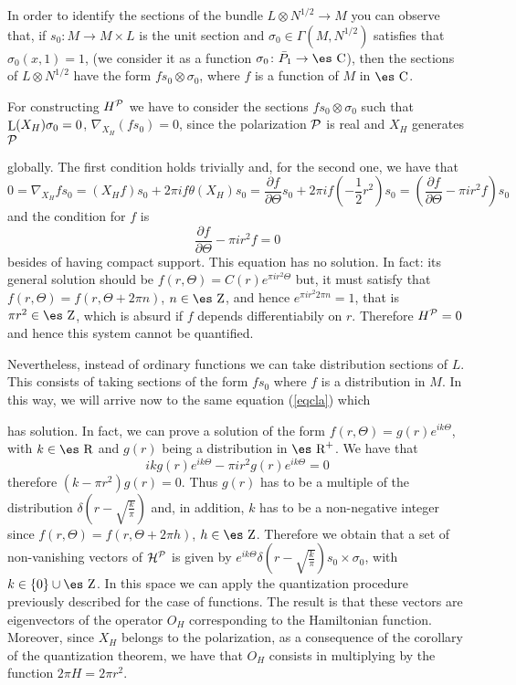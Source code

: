 \documentclass[12pt]{article}
\theoremstyle{plain}
\def\beq{\begin{equation}}
\def\eeq{\end{equation}}
\def\derpar#1#2{\frac{\partial{#1}}{\partial{#2}}}
\def\Zahl{\mbox{\es Z}}
\def\Real{\mbox{\es R}}
\def\Complex{\mbox{\es C}}
\def\Lie{\mathop{\rm L}\nolimits}
\begin{document}
In order to identify the sections of the bundle
$L \otimes N^{1/2} \to M$ you can observe that, if
$s_0 \colon M \to M \times L$ is the unit section and
$\sigma_0 \in \Gamma (M,N^{1/2})$ satisfies that
$\sigma_0(x,1)=1$, (we consider it as a function
$\sigma_0 \colon \bar P_1 \to \Complex$),
then the sections of $L \otimes N^{1/2}$ have the form
$fs_0 \otimes \sigma_0$, where $f$ is a function of $M$ in $\Complex$.

For constructing $H^{\cal P}$ we have to consider the sections
$fs_0 \otimes \sigma_0$ such that
$\Lie(X_H)\sigma_0=0$, $\nabla_{X_H}(fs_0)=0$,
since the polarization ${\cal P}$ is real and $X_H$ generates ${\cal P}$

globally.
The first condition holds trivially and, for the second one, we have
that
$$
0=\nabla_{X_H}fs_0 =(X_Hf)s_0 + 2\pi i f \theta (X_H)s_0=
\derpar{f}{\Theta}s_0 + 2\pi i f(-\frac{1}{2}r^2)s_0 =
(\derpar{f}{\Theta} - \pi i r^2 f)s_0
$$
and the condition for $f$ is
\beq
\derpar{f}{\Theta} - \pi i r^2 f = 0
\label{eqcla}
\eeq
besides of having compact support. This equation has no solution.
In fact: its general solution should be $f(r,\Theta) = C(r)e^{\pi i r^2
\Theta}$
but, it must satisfy that $f(r,\Theta) = f(r,\Theta+2\pi n)$, $n \in
\Zahl$,
and hence $e^{\pi i r^2 2 \pi n} = 1$,
that is $\pi r^2 \in \Zahl$, which is absurd if $f$ depends
differentiabily on $r$.
Therefore $H^{\cal P}=0$ and hence this system cannot be quantified.

Nevertheless, instead of ordinary functions we can take distribution
sections of $L$.
This consists of taking sections of the form $fs_0$ where $f$ is a
distribution in $M$.
In this way, we will arrive now to the same equation (\ref{eqcla}) which

has solution.
In fact, we can prove a solution of the form
$f(r,\Theta)=g(r)e^{ik\Theta}$, with $k \in \Real$ and $g(r)$
being a distribution in $\Real^+$. We have that
$$
ikg(r)e^{ik\Theta}-\pi ir^2g(r)e^{ik\Theta}=0
$$
therefore $(k-\pi r^2)g(r)=0$.
Thus $g(r)$ has to be a multiple of the distribution $\delta
(r-\sqrt{\frac{k}{\pi}})$
and, in addition, $k$ has to be a non-negative integer since
$f(r,\Theta ) = f(r,\Theta +2\pi h)$, $h \in \Zahl$.
Therefore we obtain that a set of non-vanishing vectors of
${\cal H}^{\cal P}$ is given by
$e^{ik\Theta}\delta (r-\sqrt{\frac{k}{\pi}})s_0 \times \sigma_0$,
with $k\in\{ 0\}\cup\Zahl$.
In this space we can apply the quantization procedure previously
described
for the case of functions. The result is that these vectors are
eigenvectors of the operator $O_H$ corresponding to the Hamiltonian
function.
Moreover, since $X_H$ belongs to the polarization,
as a consequence of the corollary of the quantization theorem,
we have that $O_H$ consists in multiplying by the function $2\pi H =
2\pi r^2$.
\end{document}
